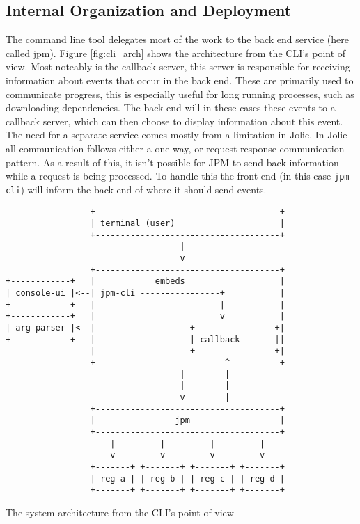 \subsection{Internal Organization and Deployment}

The command line tool delegates most of the work to the back end service (here
called jpm). Figure \ref{fig:cli_arch} shows the architecture from the CLI's
point of view. Most noteably is the callback server, this server is responsible
for receiving information about events that occur in the back end. These are
primarily used to communicate progress, this is especially useful for long
running processes, such as downloading dependencies. The back end will in these
cases these events to a callback server, which can then choose to display
information about this event. The need for a separate service comes mostly from
a limitation in Jolie. In Jolie all communication follows either a one-way, or
request-response communication pattern. As a result of this, it isn't possible
for JPM to send back information while a request is being processed. To handle
this the front end (in this case \texttt{jpm-cli}) will inform the
back end of where it should send events.

\begin{listing}[H]
\begin{verbatim}
                 +-------------------------------------+
                 | terminal (user)                     |
                 +-------------------------------------+
                                   |
                                   v
                 +-------------------------------------+
+------------+   |            embeds                   |
| console-ui |<--| jpm-cli ----------------+           |
+------------+   |                         |           |
+------------+   |                         v           |
| arg-parser |<--|                   +----------------+|
+------------+   |                   | callback       ||
                 |                   +----------------+|
                 +--------------------------^----------+
                                   |        |
                                   |        |
                                   v        |
                 +-------------------------------------+
                 |                jpm                  |
                 +-------------------------------------+
                     |         |         |         |
                     v         v         v         v
                 +-------+ +-------+ +-------+ +-------+
                 | reg-a | | reg-b | | reg-c | | reg-d |
                 +-------+ +-------+ +-------+ +-------+
\end{verbatim}
\caption{The system architecture from the CLI's point of view}
\label{fig:cli_arch}
\end{listing}

